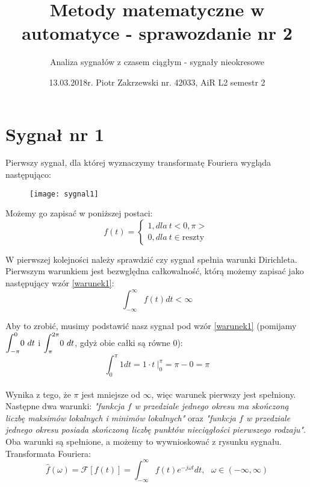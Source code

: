 \documentclass[11pt,a4paper]{article}
\title{Metody matematyczne w automatyce - sprawozdanie nr 2}
\author{Analiza sygnałów z czasem ciągłym - sygnały nieokresowe}
\date{13.03.2018r. Piotr Zakrzewski nr. 42033, AiR L2 semestr 2}
\numberwithin{liczba1}{liczba2}
\newcommand\tab[1][1cm]{\hspace*{#1}}
\begin{document}
\maketitle
\section{Sygnał nr 1}

\tab Pierwszy sygnał, dla której wyznaczymy transformatę Fouriera wygląda następująco:
\begin{figure}[h]
\centering
\texttt{[image: sygnal1]}
\end{figure}

Możemy go zapisać w poniższej postaci:
\[
    f(t) =\left\{
                \begin{array}{ll}
                  1, dla\ t <0,\pi> \\
                  0, dla\ t \in \text{reszty}
                \end{array}
\label{sygnal1klamra}
\tag{1.1}
              \right.
\]

W pierwszej kolejności należy sprawdzić czy sygnał spełnia warunki Dirichleta. Pierwszym warunkiem jest bezwględna całkowalność, którą możemy zapisać jako następujący wzór \ref{warunek1}: \\
\begin{equation}
\int_{-\infty}^{\infty} f(t) dt < \infty
\label{warunek1}
\end{equation}
\pagebreak

Aby to zrobić, musimy podstawić nasz sygnał pod wzór \ref{warunek1} (pomijamy $ \mathlarger{\int_{-\pi}^{0}} 0 \ dt $ i $ \mathlarger{\int_{\pi}^{2\pi}} 0 \ dt $, gdyż obie całki są równe 0): \\
\begin{equation}
\int_{0}^{\pi} 1 dt = 1 \cdot t \ \Bigg|^\pi_0 = \pi - 0 = \pi
\end{equation} \\

Wynika z tego, że $ \pi $ jest mniejsze od $ \infty $, więc warunek pierwszy jest spełniony. Następne dwa warunki: \textit{"funkcja $ f $ w przedziale jednego okresu ma skończoną liczbę maksimów lokalnych i minimów lokalnych"} oraz \textit{"funkcja $ f $ w przedziale jednego okresu posiada skończoną liczbę punktów nieciągłości pierwszego rodzaju"}. Oba warunki są spełnione, a możemy to wywnioskować z rysunku sygnału. \\

Transformata Fouriera: \\
\begin{equation}
\hat{f} (\omega) = \mathcal{F}[f(t)] = \int_{-\infty}^{\infty} f(t) e^{-j \omega t} dt, \ \ \ \omega \in (-\infty,\infty)
\label{transformata}
\end{equation}
\end{document}
